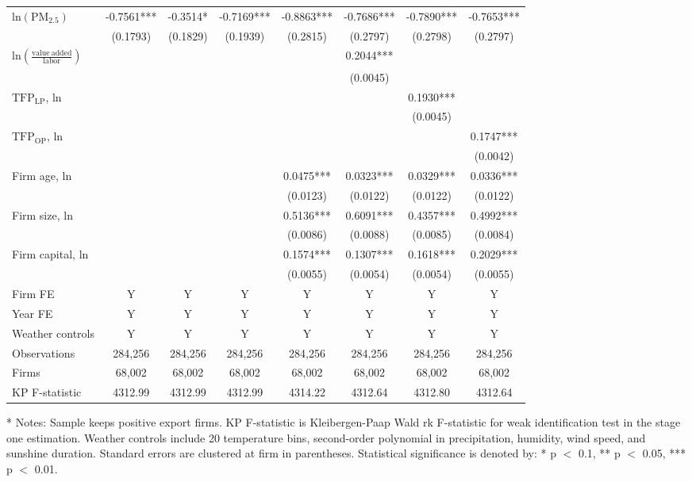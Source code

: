 \documentclass[12pt]{article}
\begin{document}
\begin{table}[H]
{\begin{tabular}{l*{7}{c}}
$\mathrm{ln(PM_{2.5})}$                    
                        &-0.7561***&-0.3514*&-0.7169***&-0.8863***&-0.7686***&-0.7890***&-0.7653*** \\
                        &(0.1793)  &(0.1829)&(0.1939)  &(0.2815)  &(0.2797)  &(0.2798)  &(0.2797) \\
$\mathrm{ln(\frac{value\ added}{labor})}$ &      &        &          &          & 0.2044***& &  \\
                        &      &        &          &         &(0.0045)  &          &\\
$\mathrm{TFP_{LP}}$, ln          &      &        &           &          &        &0.1930*** & \\
                        &       &        &         &         &          &(0.0045)&\\
$\mathrm{TFP_{OP}}$, ln          &       &         &        &           &        & &0.1747***\\
                        &      &         &         &         &          &         &(0.0042) \\
Firm age, ln            &       &      &        &0.0475***&0.0323***&0.0329***&0.0336***\\
                        &        &         &        &(0.0123) &(0.0122)&(0.0122)&(0.0122)\\
Firm size, ln           &        &         &        &0.5136***&0.6091***&0.4357***&0.4992***\\
                        &        &         &        &(0.0086) &(0.0088)&(0.0085) &(0.0084)\\
Firm capital, ln        &        &         &        &0.1574***&0.1307***&0.1618***&0.2029***\\
                        &        &         &        &(0.0055) &(0.0054)&(0.0054) &(0.0055)\\
     \hline
    Firm FE  &Y&Y&Y&Y&Y&Y&Y\\
    Year FE  &Y&Y&Y&Y&Y&Y&Y\\
    Weather controls &Y&Y&Y&Y&Y&Y&Y\\
    \hline
    Observations    &284,256&284,256&284,256&284,256&284,256&284,256&284,256\\
    Firms           &68,002 &68,002 &68,002 &68,002 &68,002&68,002 &68,002\\
    KP F-statistic	&4312.99&4312.99&4312.99&4314.22&4312.64&4312.80&4312.64\\
    \hline\hline
    \end{tabular}}
    \begin{tablenotes}
    \item[*] \small Notes: Sample keeps positive export firms. KP F-statistic is Kleibergen-Paap Wald rk F-statistic for weak identification test in the stage one estimation. Weather controls include 20 temperature bins, second-order polynomial in precipitation, humidity, wind speed, and sunshine duration. Standard errors are clustered at firm in parentheses. Statistical significance is denoted by: * p $<$ 0.1, ** p $<$ 0.05, *** p $<$ 0.01.
    \end{tablenotes}
    \end{table}
\end{document}
